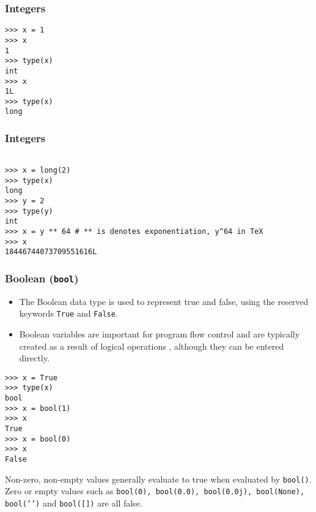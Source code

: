 \documentclass[KSmainSlides.tex]{subfiles}
\begin{document}
\begin{frame}[fragile]
\frametitle{Integers}
\begin{framed}
\begin{verbatim}
>>> x = 1
>>> x
1
>>> type(x)
int
>>> x
1L
>>> type(x)
long
\end{verbatim}
\end{framed}
\end{frame}
\begin{frame}[fragile]
\frametitle{Integers}
\begin{framed}
\begin{verbatim}

>>> x = long(2)
>>> type(x)
long
>>> y = 2
>>> type(y)
int
>>> x = y ** 64 # ** is denotes exponentiation, y^64 in TeX
>>> x
18446744073709551616L
\end{verbatim}
\end{framed}

\end{frame}
\begin{frame}[fragile]
\subsubsection{Boolean (\texttt{bool})}
\begin{itemize}
\item The Boolean data type is used to represent true and false, using the reserved keywords \texttt{True} and \texttt{False}.
\item Boolean variables are important for program flow control and are typically created as a
result of logical operations , although they can be entered directly.
\end{itemize}

\end{frame}
\begin{frame}[fragile]
\begin{framed}
\begin{verbatim}
>>> x = True
>>> type(x)
bool
>>> x = bool(1)
>>> x
True
>>> x = bool(0)
>>> x
False
\end{verbatim}
\end{framed}

\end{frame}
\begin{frame}[fragile]
Non-zero, non-empty values generally evaluate to true when evaluated by \texttt{bool()}. Zero or empty values
such as \texttt{bool(0), bool(0.0), bool(0.0j), bool(None), bool(’’)} and \texttt{bool([])} are all false.

\end{frame}
\end{document}
